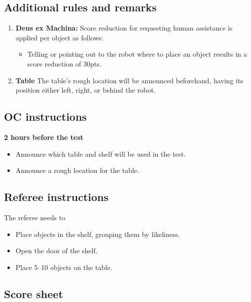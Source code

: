 %
%
\subsection{Additional rules and remarks}
\begin{enumerate}
		\item \textbf{Deus ex Machina:} Score reduction for requesting human assistance is applied per object as follows:
	\begin{itemize}[nosep]
		\item Telling or pointing out to the robot where to place an object results in a score reduction of 30pts.
	\end{itemize}

	\item \textbf{Table} The table's rough location will be announced beforehand, having its position either left, right, or behind the robot.
\end{enumerate}

\newpage
\subsection{OC instructions}

\textbf{2 hours before the test}
\begin{itemize}
	\item Announce which table and shelf will be used in the test.
	\item Announce a rough location for the table.
\end{itemize}

\subsection{Referee instructions}
The referee needs to
\begin{itemize}
	\item Place objects in the shelf, grouping them by likeliness.
	\item Open the door of the shelf.
	\item Place 5--10 objects on the table.
\end{itemize}


\newpage
\subsection{Score sheet}


